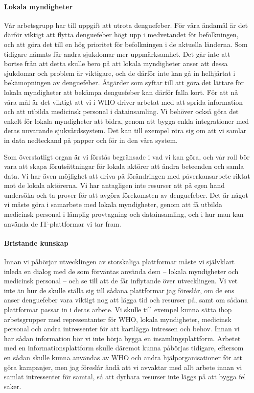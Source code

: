 \documentclass{article}
\begin{document}
\paragraph{Lokala myndigheter}
Vår arbetsgrupp har till uppgift att utrota denguefeber. För våra ändamål är det därför viktigt att flytta denguefeber högt upp i medvetandet för befolkningen, och att göra det till en hög prioritet för befolkningen i de aktuella länderna. Som tidigare nämnts får andra sjukdomar mer uppmärksamhet. Det går inte att bortse från att detta skulle bero på att lokala myndigheter anser att dessa sjukdomar och problem är viktigare, och de därför inte kan gå in helhjärtat i bekämopningen av denguefeber. Åtgärder som syftar till att göra det lättare för lokala myndigheter att bekämpa denguefeber kan därför falla kort. För att nå våra mål är det viktigt att vi i WHO driver arbetat med att sprida information och att utbilda medicinsk personal i datainsamling. Vi behöver också göra det enkelt för lokala myndigheter att bidra, genom att bygga enkla integrationer med deras nuvarande sjukvårdssystem. Det kan till exempel röra sig om att vi samlar in data nedteckand på papper och för in den våra system.

Som överstatligt organ är vi förstås begränsade i vad vi kan göra, och vår roll bör vara att skapa förutsättningar för lokala aktörer att ändra beteenden och samla data. Vi har även möjlighet att driva på förändringen med påverkansarbete riktat mot de lokala aktörerna. Vi har antagligen inte resurser att på egen hand undersöka och ta prover för att avgöra förekomsten av denguefeber. Det är något vi måste göra i samarbete med lokala myndigheter, genom att få utbilda medicinsk personal i lämplig provtagning och datainsamling, och i hur man kan använda de IT-plattformar vi tar fram.

\paragraph{Bristande kunskap}
Innan vi påbörjar utvecklingen av storskaliga plattformar måste vi självklart inleda en dialog med de som förväntas använda dem – lokala myndigheter och medicinsk personal – och se till att de får inflytande över utvecklingen. Vi vet inte än hur de skulle ställa sig till sådana plattformar jag föreslår, om de ens anser denguefeber vara viktigt nog att lägga tid och resurser på, samt om sådana plattformar passar in i deras arbete. Vi skulle till exempel kunna sätta ihop arbetsgrupper med representanter för WHO, lokala myndigheter, medicinsk personal och andra intressenter för att kartlägga intressen och behov. Innan vi har sådan information bör vi inte börja bygga en insamlingsplattform. Arbetet med en informationsplattform skulle däremot kunna påbörjas tidigare, eftersom en sådan skulle kunna användas av WHO och andra hjälporganisationer för att göra kampanjer, men jag föreslår ändå att vi avvaktar med allt arbete innan vi samlat intressenter för samtal, så att dyrbara resurser inte läggs på att bygga fel saker.
\end{document}
